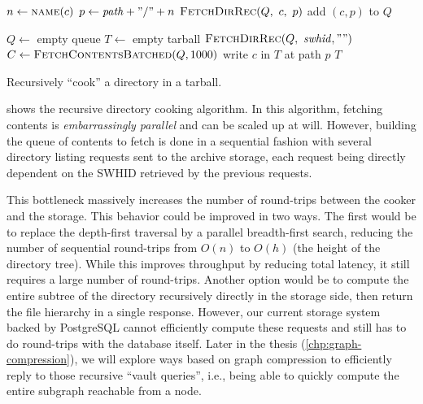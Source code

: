 \begin{algorithm}[t]
    \begin{algorithmic}
            \State $n \gets \Call{name}{c}$
            \State $p \gets \mathit{path} + "/" + n$
                \State $\Call{FetchDirRec}{Q,~c,~p}$
            \Else
                \State add $(c, p)$ to $Q$
            \EndIf
        \EndFor
        \EndFunction

        \State $Q \gets$ empty queue  
        \State $T \gets$ empty tarball  
        \State $\Call{FetchDirRec}{Q,~\mathit{swhid}, ""}$
        \State $C \gets \Call{FetchContentsBatched}{Q, 1000}$
            \State write $c$ in $T$ at path $p$
        \EndFor
        \State \Return $T$
        \EndFunction
    \end{algorithmic}

    \caption{Recursively ``cook'' a directory in a tarball.}%
    \label{algo:cooking-directory}
\end{algorithm}


 shows the recursive directory cooking
algorithm.
In this algorithm, fetching contents is \emph{embarrassingly
parallel} and can be scaled up at will. However, building the queue of contents
to fetch is done in a sequential fashion with several directory listing
requests sent to the archive storage, each request being directly dependent on
the SWHID retrieved by the previous requests.

This bottleneck massively increases the number of round-trips between the cooker
and the storage. This behavior could be improved in two ways. The first
would be to replace the depth-first traversal by a parallel breadth-first
search, reducing the number of sequential round-trips from $O(n)$ to $O(h)$
(the height of the directory tree). While this improves throughput by reducing
total latency, it still requires a large number of round-trips.
Another option would be to compute the entire subtree of the directory
recursively directly in the storage side, then return the file hierarchy in a
single response. However, our current storage system backed by PostgreSQL
cannot efficiently compute these requests and still has to do round-trips with
the database itself. Later in the thesis (\cref{chp:graph-compression}), we
will explore ways based on graph compression to efficiently reply to those
recursive ``vault queries'', i.e., being able to quickly compute the entire
subgraph reachable from a node.

